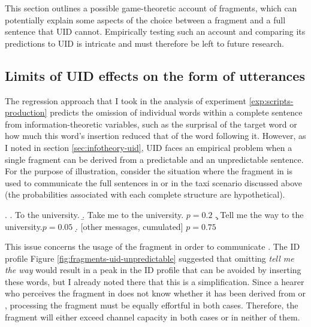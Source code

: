 \label{sec:fragments-game}

This section outlines a possible game-theoretic account of fragments, which can potentially explain some aspects of the choice between a fragment and a full sentence that UID cannot. Empirically testing such an account and comparing its predictions to UID is intricate and must therefore be left to future research.

\subsection{Limits of UID effects on the form of utterances}

The regression approach that I took in the analysis of experiment \ref{exp:scripts-production} predicts the omission of individual words within a complete sentence from information-theoretic variables, such as the surprisal of the target word or how much this word's insertion reduced that of the word following it. However, as I noted in section \ref{sec:infotheory-uid}, UID faces an empirical problem when a single fragment can be derived from a predictable and an unpredictable sentence. For the purpose of illustration, consider the situation where the fragment in \Next[a] is used to communicate the full sentences in \Next[b] or \Next[c] in the taxi scenario discussed above (the probabilities associated with each complete structure are hypothetical).

\ex. \a. To the university.
    \b. Take me to the university. \hfill $p = 0.2$
    \c. Tell me the way to the university.\hfill $p = 0.05$
    \d. [other messages, cumulated] \hfill $p = 0.75$

This issue concerns the usage of the fragment in order to communicate \Last[c]. The ID profile Figure \ref{fig:fragments-uid-unpredictable} suggested that omitting \textit{tell me the way} would result in a peak in the ID profile that can be avoided by inserting these words, but I already noted there that this is a simplification. Since a hearer who perceives the fragment in \Last[a] does not know whether it has been derived from \Last[b] or \Last[c], processing the fragment must be equally effortful in both cases. Therefore, the fragment will either exceed channel capacity in both cases or in neither of them. %

